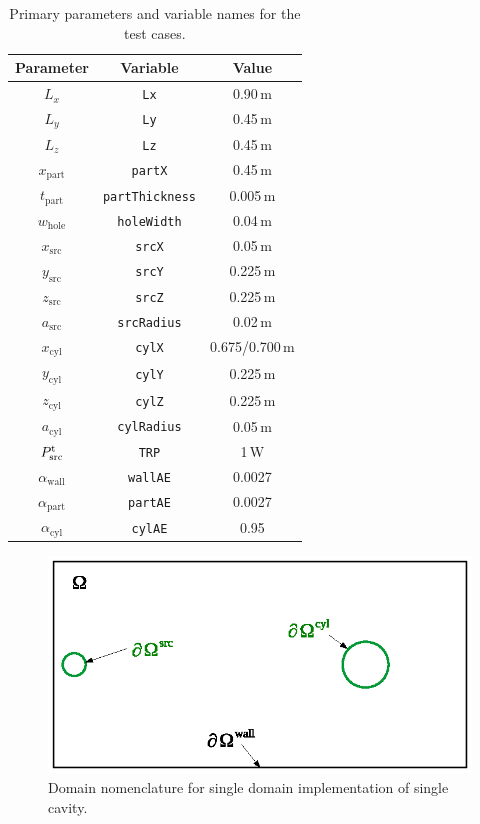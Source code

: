 \documentclass[a4paper]{article}
\numberwithin{equation}{section}
\begin{document}
\begin{table}[ht]
\begin{center}
\begin{tabular}{|c|c|c|}
\hline
\textbf{Parameter}     &\textbf{Variable}      & \textbf{Value} \\
\hline
$L_x$                  &\texttt{Lx}            &0.90\,m \\
$L_y$                  &\texttt{Ly}            &0.45\,m \\
$L_z$                  &\texttt{Lz}            &0.45\,m \\
$x_\mathrm{part}$      &\texttt{partX}         &0.45\,m \\
$t_\mathrm{part}$      &\texttt{partThickness} &0.005\,m \\
$w_\mathrm{hole}$      &\texttt{holeWidth}     &0.04\,m \\
$x_\mathrm{src}$       &\texttt{srcX}          &0.05\,m \\
$y_\mathrm{src}$       &\texttt{srcY}          &0.225\,m \\
$z_\mathrm{src}$       &\texttt{srcZ}          &0.225\,m \\
$a_\mathrm{src}$       &\texttt{srcRadius}     &0.02\,m \\
$x_\mathrm{cyl}$       &\texttt{cylX}          &0.675/{\color{red}0.700\,m} \\
$y_\mathrm{cyl}$       &\texttt{cylY}          &0.225\,m \\
$z_\mathrm{cyl}$       &\texttt{cylZ}          &0.225\,m \\
$a_\mathrm{cyl}$       &\texttt{cylRadius}     &0.05\,m \\
\hline
$P^{\mathrm{t}}_\mathrm{src}$   &\texttt{TRP}           &1\,W \\
$\alpha_\mathrm{wall}$ &\texttt{wallAE}        &0.0027 \\
$\alpha_\mathrm{part}$ &\texttt{partAE}        &0.0027 \\
$\alpha_\mathrm{cyl}$  &\texttt{cylAE}         &0.95 \\
\hline
\end{tabular}
\end{center}
\caption{\label{tb:tcparam} Primary parameters and variable names for the test cases.}
\end{table}

\begin{figure}[ht]
\begin{center}
\includegraphics[width=0.6\linewidth]{figures/domains0}
\vspace{-4mm}
\caption{\label{fg:tcdom0} Domain nomenclature for single domain implementation of single cavity.}
\end{center}
\end{figure}
\end{document}
